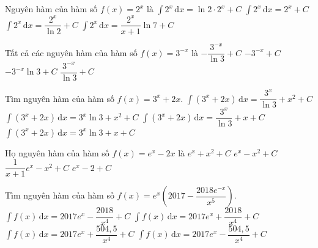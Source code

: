 \begin{ex}%
	Nguyên hàm của hàm số  $f(x)=2^x$ là
	\choice
	{$\displaystyle\int 2^x \mathrm{\,d}x=\ln 2\cdot 2^x+C$}
	{$\displaystyle\int 2^x \mathrm{\,d}x=2^x+C$}
	{\True $\displaystyle\int 2^x \mathrm{\,d}x=\dfrac{2^{x}}{\ln 2}+C$}
	{$\displaystyle\int 2^x \mathrm{\,d}x=\dfrac{2^x}{x+1}\ln 7+C$}
\end{ex}

\begin{ex}%
	Tất cả các nguyên hàm của hàm số  $f(x)=3^{-x}$ là
	\choice
	{\True $-\dfrac{3^{-x}}{\ln 3}+C$}
	{$-3^{-x}+C$}
	{$-3^{-x}\ln 3+C$}
	{$\dfrac{3^{-x}}{\ln 3}+C$}
\end{ex}

\begin{ex}%
	Tìm nguyên hàm của hàm số $f(x)=3^x+2x$.
	\choice
	{\True $\displaystyle\int (3^x+2x) \mathrm{\,d}x=\dfrac{3^x}{\ln 3}+x^2+C$}
	{$\displaystyle\int (3^x+2x) \mathrm{\,d}x=3^x\ln 3+x^2+C$}
	{$\displaystyle\int (3^x+2x) \mathrm{\,d}x=\dfrac{3^x}{\ln 3}+x+C$}
	{$\displaystyle\int (3^x+2x) \mathrm{\,d}x=3^x\ln 3+x+C$}
\end{ex}

\begin{ex}%
	Họ nguyên hàm của hàm số $f(x)=e^x-2x$ là
	\choice
	{$e^x+x^2+C$}
	{\True $e^x-x^2+C$}
	{$\dfrac{1}{x+1}e^x-x^2+C$}
	{$e^x-2+C$}
\end{ex}

\begin{ex}%
	Tìm nguyên hàm của hàm số $f(x)=e^x\left(2017-\dfrac{2018e^{-x}}{x^5}\right) $.
	\choice
	{$\displaystyle\int f(x) \mathrm{\,d}x=2017e^x-\dfrac{2018}{x^4}+C$}
	{$\displaystyle\int f(x) \mathrm{\,d}x=2017e^x+\dfrac{2018}{x^4}+C$}
	{\True $\displaystyle\int f(x) \mathrm{\,d}x=2017e^x+\dfrac{504{,}5}{x^4}+C$}
	{$\displaystyle\int f(x) \mathrm{\,d}x=2017e^x-\dfrac{504{,}5}{x^4}+C$}
\end{ex}

